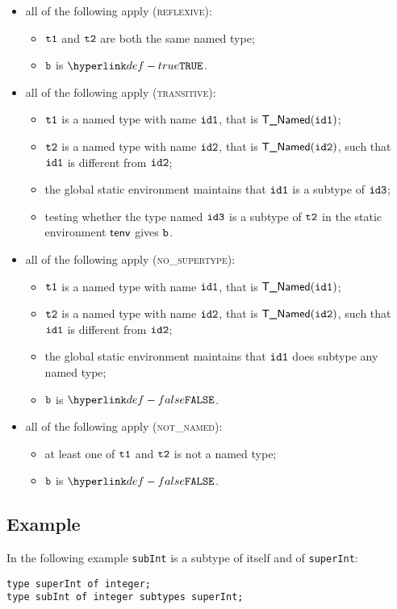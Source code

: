 \documentclass{book}
\begin{document}
\begin{itemize}
  \item all of the following apply (\textsc{reflexive}):
  \begin{itemize}
    \item $\texttt{t1}$ and $\texttt{t2}$ are both the same named type;
    \item $\texttt{b}$ is $\True$.
  \end{itemize}

  \item all of the following apply (\textsc{transitive}):
  \begin{itemize}
    \item $\texttt{t1}$ is a named type with name $\texttt{id1}$, that is $\textsf{T\_Named}(\texttt{id1})$;
    \item $\texttt{t2}$ is a named type with name $\texttt{id2}$, that is $\textsf{T\_Named}(\texttt{id2})$, such that $\texttt{id1}$ is different from $\texttt{id2}$;
    \item the global static environment maintains that $\texttt{id1}$ is a subtype of $\texttt{id3}$;
    \item testing whether the type named $\texttt{id3}$ is a subtype of $\texttt{t2}$ in the static environment $\textsf{tenv}$
    gives $\texttt{b}$.
  \end{itemize}

  \item all of the following apply (\textsc{no\_supertype}):
  \begin{itemize}
    \item $\texttt{t1}$ is a named type with name $\texttt{id1}$, that is $\textsf{T\_Named}(\texttt{id1})$;
    \item $\texttt{t2}$ is a named type with name $\texttt{id2}$, that is $\textsf{T\_Named}(\texttt{id2})$, such that $\texttt{id1}$ is different from $\texttt{id2}$;
    \item the global static environment maintains that $\texttt{id1}$ does subtype any named type;
    \item $\texttt{b}$ is $\False$.
  \end{itemize}

  \item all of the following apply (\textsc{not\_named}):
  \begin{itemize}
    \item at least one of $\texttt{t1}$ and $\texttt{t2}$ is not a named type;
    \item $\texttt{b}$ is $\False$.
  \end{itemize}
\end{itemize}
\subsection{Example}
In the following example \texttt{subInt} is a subtype of itself and of \texttt{superInt}:
\begin{verbatim}
type superInt of integer;
type subInt of integer subtypes superInt;
\end{verbatim}
\end{document}
